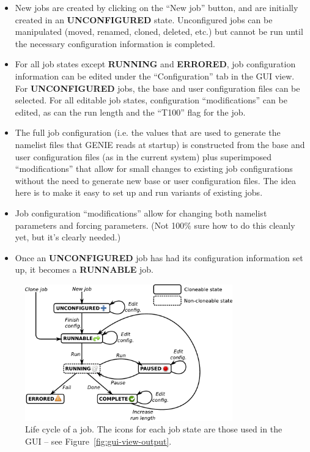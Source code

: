 \documentclass[a4paper,11pt,article]{memoir}
\begin{document}
\begin{itemize}
  \item{New jobs are created by clicking on the ``New job'' button,
    and are initially created in an \textbf{UNCONFIGURED} state.
    Unconfigured jobs can be manipulated (moved, renamed, cloned,
    deleted, etc.) but cannot be run until the necessary configuration
    information is completed.}
  \item{For all job states except \textbf{RUNNING} and
    \textbf{ERRORED}, job configuration information can be edited
    under the ``Configuration'' tab in the GUI view.  For
    \textbf{UNCONFIGURED} jobs, the base and user configuration files
    can be selected.  For all editable job states, configuration
    ``modifications'' can be edited, as can the run length and the
    ``T100'' flag for the job.}
  \item{The full job configuration (i.e. the values that are used to
    generate the namelist files that GENIE reads at startup) is
    constructed from the base and user configuration files (as in the
    current system) plus superimposed ``modifications'' that allow for
    small changes to existing job configurations without the need to
    generate new base or user configuration files.  The idea here is
    to make it easy to set up and run variants of existing jobs.}
  \item{Job configuration ``modifications'' allow for changing both
    namelist parameters and forcing parameters.  (Not 100\% sure how
    to do this cleanly yet, but it's clearly needed.)}
  \item{Once an \textbf{UNCONFIGURED} job has had its configuration
    information set up, it becomes a \textbf{RUNNABLE} job.}
\end{itemize}

\begin{figure}
  \begin{center}
    \includegraphics[width=0.8\textwidth]{job-life-cycle}
  \end{center}
  \caption{Life cycle of a job.  The icons for each job state are
    those used in the GUI -- see Figure~\ref{fig:gui-view-output}.}
  \label{fig:job-life-cycle}
\end{figure}
\end{document}
